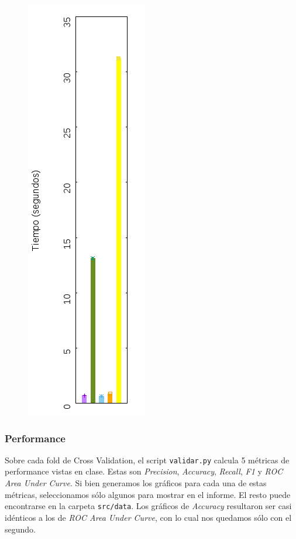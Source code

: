 \documentclass[10pt, a4paper]{article}
\begin{document}
\begin{figure}[H]
\includegraphics[scale=0.6,angle=-90]{../src/data/tm.png}
\end{figure}

\subsubsection{Performance}

Sobre cada fold de Cross Validation, el script \texttt{validar.py} calcula 5 métricas de performance vistas en clase. Estas son \textit{Precision}, \textit{Accuracy}, \textit{Recall}, \textit{F1} y \textit{ROC Area Under Curve}. Si bien generamos los gráficos para cada una de estas métricas, seleccionamos sólo algunos para mostrar en el informe. El resto puede encontrarse en la carpeta \texttt{src/data}. Los gráficos de \textit{Accuracy} resultaron ser casi idénticos a los de \textit{ROC Area Under Curve}, con lo cual nos quedamos sólo con el segundo.
\end{document}
